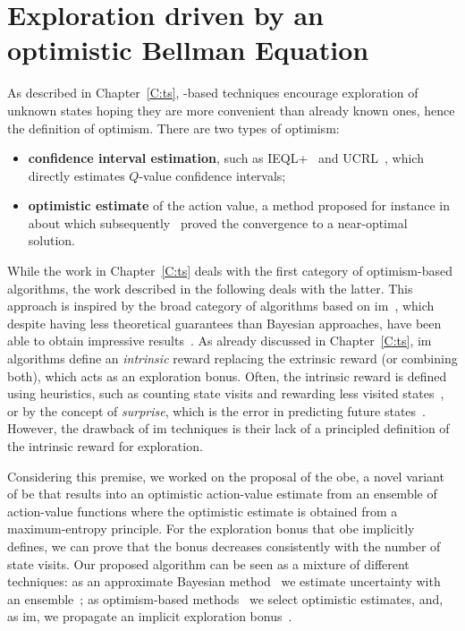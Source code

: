 \chapter{Exploration driven by an optimistic Bellman Equation}\label{C:opt}
As described in Chapter~\ref{C:ts}, -based techniques encourage exploration of unknown states hoping they are more convenient than already known ones, hence the definition of optimism. There are two types of optimism:
\begin{itemize}
\item \textbf{confidence interval estimation}, such as IEQL+~\cite{meuleau1999exploration} and UCRL~\cite{auer2007logarithmic}, which directly estimates $Q$-value confidence intervals;
 \item \textbf{optimistic estimate} of the action value, a method proposed for instance in~\cite{sutton1998reinforcement} about which subsequently~\cite{even2002convergence} proved the convergence to a near-optimal solution.
\end{itemize}
While the work in Chapter~\ref{C:ts} deals with the first category of optimism-based algorithms, the work described in the following deals with the latter. This approach is inspired by the broad category of algorithms based on \gls{im}~\cite{singh2004intrinsically}, which despite having less theoretical guarantees
than Bayesian approaches, have been able to obtain impressive results~\cite{bellemare2016unifying}. As already discussed in Chapter~\ref{C:ts}, \gls{im}
algorithms define an \textit{intrinsic} reward replacing the extrinsic reward (or combining both), which acts as an exploration bonus. Often, the intrinsic reward is defined using heuristics, such as counting state visits and rewarding less visited states~\cite{ostrovski2017count}, or by the concept of \textit{surprise}, which is the error in predicting future states~\cite{pathak2017curiosity}. However, the drawback of \gls{im} techniques is their lack of a principled definition of the intrinsic reward for exploration.

Considering this premise, we worked on the proposal of the \gls{obe}, a novel variant of \gls{be} that results into an optimistic action-value estimate
from an ensemble of action-value functions where the optimistic estimate is obtained from a maximum-entropy principle. For the exploration bonus that \gls{obe} implicitly defines, we can prove that the bonus decreases consistently with the number of
state visits. Our proposed algorithm can be seen as a mixture of
different techniques: as an approximate Bayesian method~\cite{engel2005reinforcement,vlassis2012bayesian} we estimate uncertainty with an ensemble~\cite{osband2017deep}; as optimism-based methods~\cite{lai1985asymptotically,kearns2002near,brafman2002r,azizzadenesheli2517efficient} we select
optimistic estimates, and, as \gls{im}, we propagate an implicit
exploration bonus~\cite{singh2004intrinsically,schmidhuber2008driven,white2010interval}.

